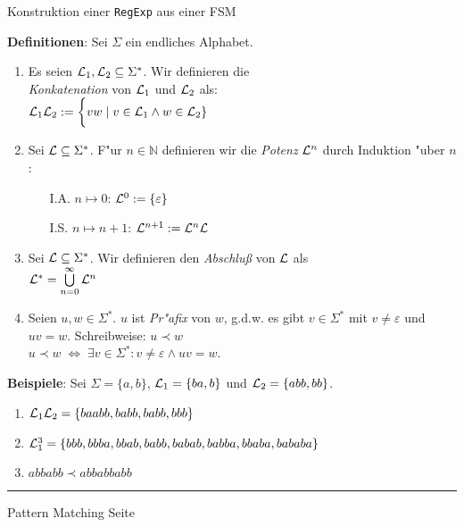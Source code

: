 \begin{slide}{}
\normalsize

\begin{center}
Konstruktion einer \texttt{RegExp} aus einer FSM
\end{center}
\vspace*{0.5cm}

\footnotesize
\textbf{Definitionen}: Sei $\Sigma$ ein endliches Alphabet.
\begin{enumerate}
\item  Es seien ${\cal L}_1, {\cal L}_2 \subseteq \Sigma^*$. Wir definieren die\\ 
       \emph{Konkatenation} von ${\cal L}_1$ und ${\cal L}_2$ als:\\[0.3cm]
      \hspace*{1.3cm} ${\cal L}_1 {\cal L}_2 := \bigg\{ vw  \;|\; v \in {\cal L}_1 \wedge w \in {\cal L}_2 \}$
\item Sei ${\cal L} \subseteq \Sigma^*$. F"ur $n \in \mathbb{N}$ definieren wir die \emph{Potenz} ${\cal L}^n$ durch
      Induktion "uber $n$:
      \begin{enumerate}
      \item[I.A.] $n \mapsto 0$:    \hspace*{2.3cm} ${\cal L}^0 := \{ \varepsilon \}$
      \item[I.S.] $n \mapsto n+1$: \hspace*{1.0cm} ${\cal L}^{n+1} := {\cal L}^n {\cal L}$
      \end{enumerate}
\item Sei ${\cal L} \subseteq \Sigma^*$. Wir definieren den \emph{Abschlu{\ss}} von ${\cal L}$ als \\[0.3cm]
      \hspace*{1.3cm} ${\cal L}^* = \bigcup\limits_{n=0}^\infty {\cal L}^n$
\item Seien $u,w \in \Sigma^*$.  $u$ ist \emph{Pr"afix} von $w$,
      g.d.w. es gibt $v \in \Sigma^*$  mit $v \not= \varepsilon$ und $uv = w$.
      Schreibweise: $u \prec w$        \\[0.3cm]
      \hspace*{1.3cm} $u \prec w \;\Leftrightarrow\; \exists v \in \Sigma^*: v \not= \varepsilon \wedge uv = w$.
\end{enumerate}
\textbf{Beispiele}: Sei $\Sigma = \{a,b\}$, ${\cal L}_1 = \{ba, b\}$ und ${\cal L}_2 = \{abb, bb\}$.
\begin{enumerate}
\item ${\cal L}_1{\cal L}_2 = \{ baabb, babb, babb, bbb\}$
\item ${\cal L}_1^3 = \{ bbb, bbba, bbab, babb, babab, babba, bbaba, bababa \}$
\item $abbabb \prec abbabbabb$
\end{enumerate}

\vspace*{\fill}
\tiny \addtocounter{mypage}{1}
\rule{17cm}{1mm}
Pattern Matching \hspace*{\fill} Seite 
\end{slide}

